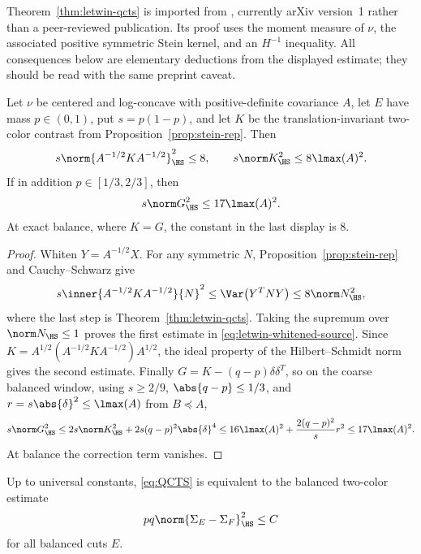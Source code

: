\documentclass[../../main.tex]{subfiles}
\begin{document}
\begin{remark}
\label{rem:letwin-status}
Theorem~\ref{thm:letwin-qcts} is imported from
\cite[Thm.~1.2]{Letwin2026QuadraticKLS}, currently arXiv version~1 rather than a peer-reviewed
publication. Its proof uses the moment measure of $\nu$, the associated positive symmetric Stein
kernel, and an $H^{-1}$ inequality. All consequences below are elementary deductions from the
displayed estimate; they should be read with the same preprint caveat.
\end{remark}

\begin{corollary}
\label{cor:qcts-source}
Let $\nu$ be centered and log-concave with positive-definite covariance $A$, let $E$ have mass
$p\in(0,1)$, put $s=p(1-p)$, and let $K$ be the translation-invariant two-color contrast from
Proposition~\ref{prop:stein-rep}. Then
\begin{equation}\label{eq:letwin-whitened-source}
  s\norm{A^{-1/2}KA^{-1/2}}_{\HS}^2\le8,
  \qquad
  s\norm K_{\HS}^2\le8\lmax(A)^2.
\end{equation}
If in addition $p\in[1/3,2/3]$, then
\begin{equation}\label{eq:letwin-euclidean-source}
  s\norm G_{\HS}^2\le17\lmax(A)^2.
\end{equation}
At exact balance, where $K=G$, the constant in the last display is $8$.
\end{corollary}

\begin{proof}
Whiten $Y=A^{-1/2}X$. For any symmetric $N$, Proposition~\ref{prop:stein-rep} and
Cauchy--Schwarz give
\[
  s\inner{A^{-1/2}KA^{-1/2}}{N}^2
  \le \Var\bigl(Y^TNY\bigr)
  \le 8\norm N_{\HS}^2,
\]
where the last step is Theorem~\ref{thm:letwin-qcts}. Taking the supremum over
$\norm N_{\HS}\le1$ proves the first estimate in \eqref{eq:letwin-whitened-source}. Since
$K=A^{1/2}(A^{-1/2}KA^{-1/2})A^{1/2}$, the ideal property of the Hilbert--Schmidt norm gives the
second estimate. Finally $G=K-(q-p)\delta\delta^T$, so on the coarse balanced window,
using $s\ge2/9$, $\abs{q-p}\le1/3$, and $r=s\abs{\delta}^2\le\lmax(A)$ from $B\preceq A$,
\[
  s\norm G_{\HS}^2
  \le2s\norm K_{\HS}^2+2s(q-p)^2\abs{\delta}^4
  \le16\lmax(A)^2+\frac{2(q-p)^2}{s}r^2
  \le17\lmax(A)^2.
\]
At balance the correction term vanishes.
\end{proof}

\begin{proposition}
\label{prop:qcts-equivalence}
Up to universal constants, \eqref{eq:QCTS} is equivalent to the balanced two-color estimate
\begin{equation}\label{eq:balanced-two-color-static}
  pq\norm{\Sigma_E-\Sigma_F}_{\HS}^2\le C
\end{equation}
for all balanced cuts $E$.
\end{proposition}
\end{document}

